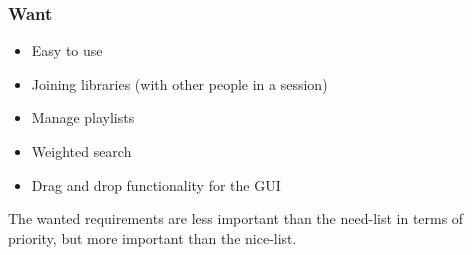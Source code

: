 \subsubsection{Want}


\begin{itemize}
	\item Easy to use 
	\item Joining libraries (with other people in a session)
	\item Manage playlists
	\item Weighted search
	\item Drag and drop functionality for the GUI
\end{itemize}


The wanted requirements are less important than the need-list in terms of priority, but more important than the nice-list.